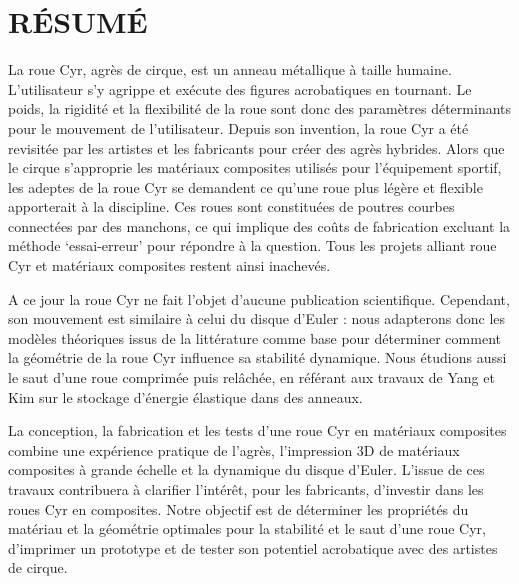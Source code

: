 %
\chapter*{RÉSUMÉ}\thispagestyle{headings}

La roue Cyr, agrès de cirque, est un anneau métallique à taille humaine. L’utilisateur s’y agrippe et exécute des figures acrobatiques en tournant. Le poids, la rigidité et la flexibilité de la roue sont donc des paramètres déterminants pour le mouvement de l’utilisateur. Depuis son invention, la roue Cyr a été revisitée par les artistes et les fabricants pour créer des agrès hybrides. Alors que le cirque s’approprie les matériaux composites utilisés pour l’équipement sportif, les adeptes de la roue Cyr se demandent ce qu’une roue plus légère et flexible apporterait à la discipline. Ces roues sont constituées de poutres courbes connectées par des manchons, ce qui implique des coûts de fabrication excluant la méthode ‘essai-erreur’ pour répondre à la question. Tous les projets alliant roue Cyr et matériaux composites restent ainsi inachevés. 

A ce jour la roue Cyr ne fait l’objet d’aucune publication scientifique. Cependant, son mouvement est similaire à celui du disque d’Euler : nous adapterons donc les modèles théoriques issus de la littérature comme base pour déterminer comment la géométrie de la roue Cyr influence sa stabilité dynamique. Nous étudions aussi le saut d’une roue comprimée puis relâchée, en référant aux travaux de Yang et Kim sur le stockage d’énergie élastique dans des anneaux.

La conception, la fabrication et les tests d’une roue Cyr en matériaux composites combine une expérience pratique de l’agrès, l’impression 3D de matériaux composites à grande échelle et la dynamique du disque d’Euler. L’issue de ces travaux contribuera à clarifier l’intérêt, pour les fabricants, d’investir dans les roues Cyr en composites.
Notre objectif est de déterminer les propriétés du matériau et la géométrie optimales pour la stabilité et le saut d’une roue Cyr, d’imprimer un prototype et de tester son potentiel acrobatique avec des artistes de cirque.
